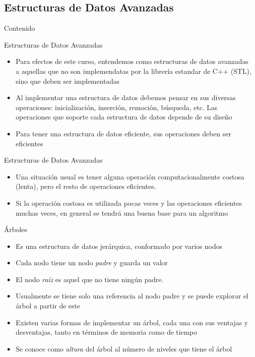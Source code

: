 \documentclass[]{beamer}
\begin{document}
\subsection{Estructuras de Datos Avanzadas}
\begin{frame}{Contenido}
\tableofcontents
\end{frame}

\begin{frame}{Estructuras de Datos Avanzadas}
  \begin{itemize}
    \item Para efectos de este curso, entendemos como estructuras de datos avanzadas a aquellas que no son implemendatas por la librer\'ia estandar de C++ (STL), sino que deben ser implementadas
      \pause
    \item Al implementar una estructura de datos debemos pensar en sus diversas operaciones: inicializaci\'on, inserci\'on, remoci\'on, b\'usqueda, etc. Las operaciones que soporte cada estructura de datos depende de su dise\~no
      \pause
    \item Para tener una estructura de datos eficiente, sus operaciones deben ser eficientes
  \end{itemize}
\end{frame}

\begin{frame}{Estructuras de Datos Avanzadas}
  \begin{itemize}
    \item Una situaci\'on usual es tener alguna operaci\'on computacionalmente costosa (lenta), pero el resto de operaciones eficientes. 
      \pause
    \item Si la operaci\'on costosa es utilizada pocas veces y las operaciones eficientes muchas veces, en general se tendr\'a una buena base para un algoritmo
  \end{itemize}
\end{frame}

\begin{frame}{\'Arboles}
  \begin{itemize}
    \item Es una estructura de datos jer\'arquica, conformado por varios nodos
      \pause
    \item Cada nodo tiene un nodo \textit{padre} y guarda un valor
      \pause
    \item El nodo \textit{ra\'iz} es aquel que no tiene ning\'un padre. 
      \pause
    \item Usualmente se tiene solo una referencia al nodo padre y se puede explorar el \'arbol a partir de este
      \pause
    \item Existen varias formas de implementar un \'arbol, cada una con sus ventajas y desventajas, tanto en t\'erminos de memoria como de tiempo
      \pause
    \item Se conoce como \textit{altura} del \'arbol al n\'umero de niveles que tiene el \'arbol
  \end{itemize}
\end{frame}
\end{document}
